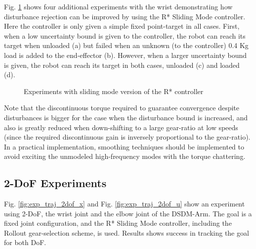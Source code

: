 Fig. \ref{fig:rob} shows four additional experiments with the wrist demonstrating how disturbance rejection can be improved by using the  R* Sliding Mode controller. Here the controller is only given a simple fixed point-target in all cases. First, when a low uncertainty bound is given to the controller, the robot can reach its target when unloaded (a) but failed when an unknown (to the controller) 0.4 Kg load is added to the end-effector (b). However, when a larger uncertainty bound is given, the robot can reach its target in both cases, unloaded (c) and loaded (d). 

\begin{figure}[htp]
        \centering
				\hspace{-10pt}
				\hspace{-5pt}
				\hspace{-5pt}
				\hspace{-5pt}
        \caption{Experiments with sliding mode version of the R* controller }
				\label{fig:rob}
\end{figure}

Note that the discontinuous torque required to guarantee convergence despite disturbances is bigger for the case when the disturbance bound is increased, and also is greatly reduced when down-shifting to a large gear-ratio at low speeds (since the required discontinuous gain is inversely proportional to the gear-ratio). In a practical implementation, smoothing techniques should be implemented to avoid exciting the unmodeled high-frequency modes with the torque chattering.

\subsection{2-DoF Experiments}

Fig. \ref{fig:exp_traj_2dof_x} and Fig. \ref{fig:exp_traj_2dof_u} show an experiment using 2-DoF, the wrist joint and the elbow joint of the DSDM-Arm. The goal is a fixed joint configuration, and the R* Sliding Mode controller, including the Rollout gear-selection scheme, is used. Results shows success in tracking the goal for both DoF.

